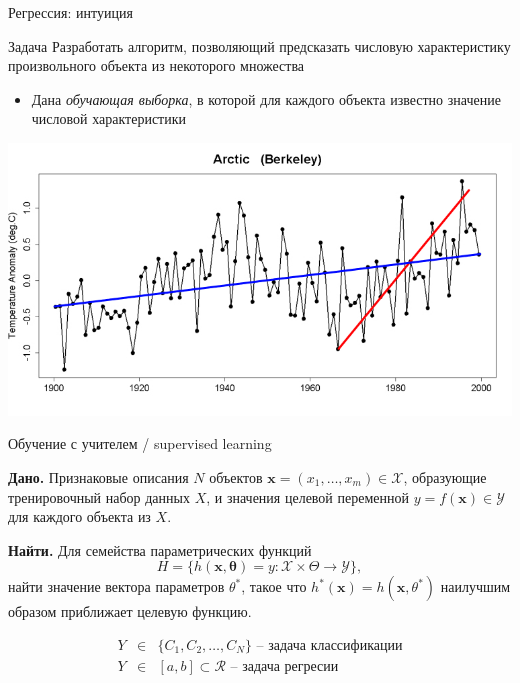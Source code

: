 \documentclass[aspectratio=169]{beamer}
\begin{document}
\begin{frame}{Регрессия: интуиция}

\begin{block}{Задача}
Разработать алгоритм, позволяющий предсказать числовую характеристику произвольного объекта из некоторого множества
\begin{itemize}
\item Дана {\it обучающая выборка}, в которой для каждого объекта известно значение числовой характеристики
\end{itemize}
\end{block}

\begin{center}
\includegraphics[scale=0.3]{images/kioto.png}
\end{center}

\end{frame}

\begin{frame}{Обучение с учителем / supervised learning}

\vspace{1em}
{\bf Дано.} Признаковые описания $N$ объектов $\mathbf{x} = (x_1, \ldots, x_m) \in \mathcal{X}$, образующие тренировочный набор данных $X$, и значения целевой переменной $y = f(\mathbf{x}) \in \mathcal{Y}$ для каждого объекта из $X$. 

\vspace{1em}
{\bf Найти.} Для семейства параметрических функций 
\[
H = \{h(\mathbf{x, \mathbf{\theta}}) = y: \mathcal{X} \times \Theta \rightarrow \mathcal{Y}\},
\]
найти значение вектора параметров $\theta^*$, такое что $h^*(\mathbf{x}) = h(\mathbf{x}, \theta^*)$ наилучшим образом приближает целевую функцию.

\begin{eqnarray*}
Y & \in & \{C_1, C_2, \ldots, C_N\} \text{ -- задача классификации}  \\
Y & \in & [a, b] \subset \mathcal{R} \text{ -- задача регресии}
\end{eqnarray*}

\end{frame}
\end{document}
